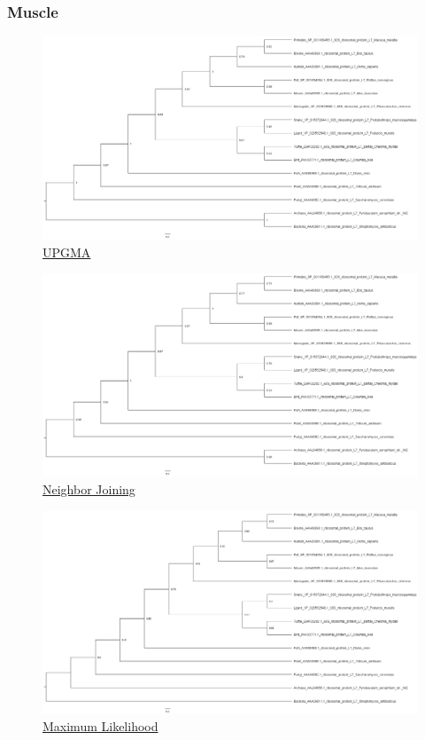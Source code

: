 \subsubsection*{Muscle}

\begin{figure}[!h]
	\includegraphics[width=1\linewidth]{Tree_Muscle/RL7_Muscle_UPGMA.png}
	\caption{\href{https://drive.google.com/file/d/11cxH8ehwfc-_q8jbqnSrhElHRs3Ktvhq/view?usp=sharing}{UPGMA}}
\end{figure}
\begin{figure}[!h]
	\includegraphics[width=1\linewidth]{Tree_Muscle/RL7_Muscle_NJ.png}
	\caption{\href{https://drive.google.com/file/d/1wzBnoBK5oBEDgvbvZISxCxtlgAArmOFH/view?usp=sharing}{Neighbor Joining}}
\end{figure}
\newpage
\begin{figure}[!h]
	\includegraphics[width=1\linewidth]{Tree_Muscle/RL7_Muscle_ML.png}
	\caption{\href{https://drive.google.com/file/d/1Mw3AzA7iSqX0yH_KnsdqV6_m5NO675vo/view?usp=sharing}{Maximum Likelihood}}
\end{figure}
\newpage


